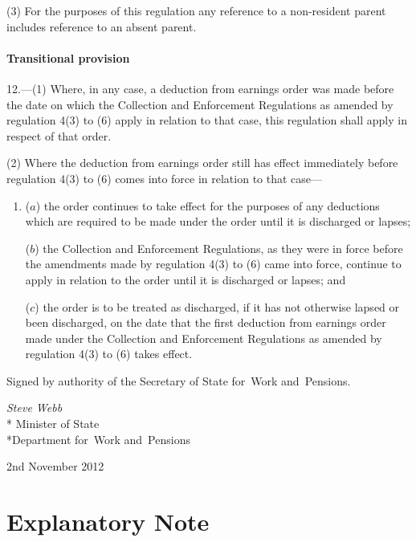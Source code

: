 \documentclass[12pt,a4paper]{article}
\begin{document}
(3) For the purposes of this regulation any reference to a non-resident parent includes reference to an absent parent.

\subsection[12. Transitional provision]{Transitional provision}

12.---(1)  Where, in any case, a deduction from earnings order was made before the date on which the Collection and Enforcement Regulations as amended by regulation 4(3) to (6) apply in relation to that case, this regulation shall apply in respect of that order.

(2) Where the deduction from earnings order still has effect immediately before regulation 4(3) to (6) comes into force in relation to that case—
\begin{enumerate}\item[]
($a$) the order continues to take effect for the purposes of any deductions which are required to be made under the order until it is discharged or lapses;

($b$) the Collection and Enforcement Regulations, as they were in force before the amendments made by regulation 4(3) to (6) came into force, continue to apply in relation to the order until it is discharged or lapses; and

($c$) the order is to be treated as discharged, if it has not otherwise lapsed or been discharged, on the date that the first deduction from earnings order made under the Collection and Enforcement Regulations as amended by regulation 4(3) to (6) takes effect. 
\end{enumerate}

\bigskip

\pagebreak[3]

Signed 
by authority of the 
Secretary of State for~Work and~Pensions.

{\raggedleft
\emph{Steve Webb}\\*
Minister
of State\\*Department 
for~Work and~Pensions

}

2nd November 2012

\small

\part{Explanatory Note}
\end{document}
